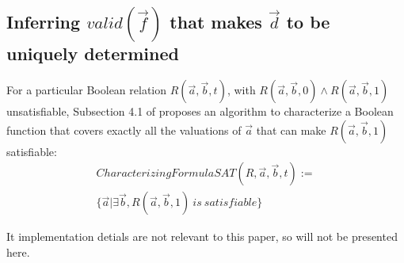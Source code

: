 \documentclass[conference]{IEEEtran}
\begin{document}





\subsection{Inferring $valid(\vec{f})$ that makes $\vec{d}$ to be uniquely determined}\label{subsec_infer}

For a particular Boolean relation $R(\vec{a},\vec{b},t)$, 
with $R(\vec{a},\vec{b},0)\wedge R(\vec{a},\vec{b},1)$ unsatisfiable,
Subsection 4.1 of \cite{QinTODAES15} proposes an algorithm 
to characterize a Boolean function 
that covers exactly all the valuations of $\vec{a}$ 
that can make $R(\vec{a},\vec{b},1)$ satisfiable:
\begin{multline}\label{eq_charsat}
 CharacterizingFormulaSAT(R,\vec{a},\vec{b},t):=\\\{\vec{a}|\exists \vec{b},R(\vec{a},\vec{b},1)~is~satisfiable\}
\end{multline}

It implementation detials are not relevant to this paper, 
so will not be presented here.
\end{document}
